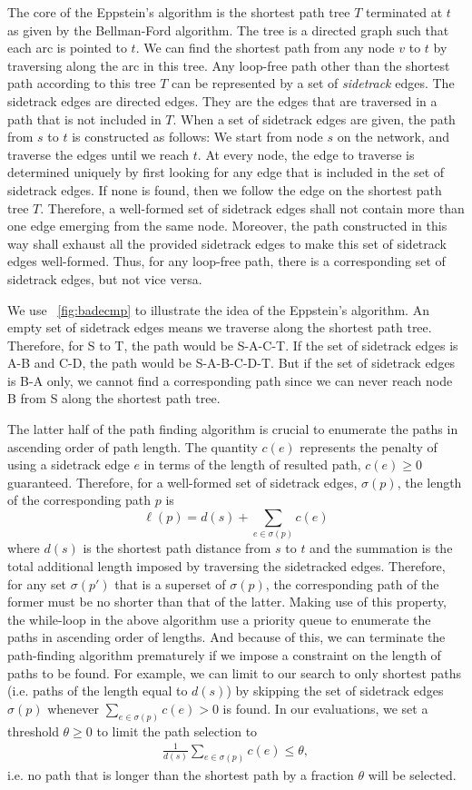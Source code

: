 \documentclass[conference]{IEEEtran}
\begin{document}
The core of the Eppstein's algorithm is the shortest path tree $T$ terminated
at $t$ as given by the Bellman-Ford algorithm. The tree is a directed graph
such that each arc is pointed to $t$. We can find the shortest path from any
node $v$ to $t$ by traversing along the arc in this tree. Any loop-free path
other than the shortest path according to this tree $T$ can be represented by a
set of \emph{sidetrack} edges. The sidetrack edges are directed edges. They are
the edges that are traversed in a path that is not included in $T$. When a set of
sidetrack edges are given, the path from $s$ to $t$ is constructed as follows:
We start from node $s$ on the network, and traverse the edges until we reach
$t$. At every node, the edge to traverse is determined uniquely by first
looking for any edge that is included in the set of sidetrack edges. If none
is found, then we follow the edge on the shortest path tree $T$. Therefore, a
well-formed set of sidetrack edges shall not contain more than one edge
emerging from the same node. Moreover, the path constructed in this way shall
exhaust all the provided sidetrack edges to make this set of sidetrack edges
well-formed. Thus, for any loop-free path, there is a corresponding set of
sidetrack edges, but not vice versa.

We use \figurename~\ref{fig:badecmp} to illustrate the idea of the Eppstein's
algorithm. An empty set of sidetrack edges means we traverse along the shortest
path tree. Therefore, for S to T, the path would be S-A-C-T. If the set of
sidetrack edges is A-B and C-D, the path would be S-A-B-C-D-T. But if the set
of sidetrack edges is B-A only, we cannot find a corresponding path since we
can never reach node B from S along the shortest path tree.

The latter half of the path finding algorithm is crucial to enumerate the paths
in ascending order of path length. The quantity $c(e)$ represents the penalty
of using a sidetrack edge $e$ in terms of the length of resulted path, $c(e)\ge
0$ guaranteed. Therefore, for a well-formed set of sidetrack edges,
$\sigma(p)$, the length of the corresponding path $p$ is \[
\ell(p) = d(s) + \sum_{e\in\sigma(p)} c(e) \]
where $d(s)$ is the shortest path distance from $s$ to $t$ and the summation is
the total additional length imposed by traversing the sidetracked edges.
Therefore, for any set $\sigma(p')$ that is a superset of $\sigma(p)$, the
corresponding path of the former must be no shorter than that of the latter.
Making use of this property, the while-loop in the above algorithm use a
priority queue to enumerate the paths in ascending order of lengths. And
because of this, we can terminate the path-finding algorithm prematurely if we
impose a constraint on the length of paths to be found. For example, we can
limit to our search to only shortest paths (i.e. paths of the length equal to
$d(s)$) by skipping the set of sidetrack edges $\sigma(p)$ whenever
$\sum_{e\in\sigma(p)} c(e) > 0$ is found. In our evaluations, we set a
threshold $\theta\ge 0$ to limit the path selection to
\begin{align*}
\frac{1}{d(s)}\sum_{e\in\sigma(p)}c(e) \le \theta,
\end{align*}
i.e. no path that is longer than the shortest path by a fraction $\theta$ will
be selected.
\end{document}

